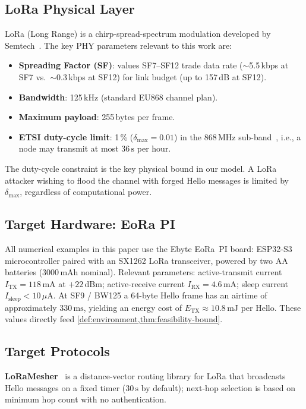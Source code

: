 \documentclass[journal,compsoc]{IEEEtran}
\theoremstyle{plain}
\theoremstyle{definition}
\theoremstyle{remark}
\begin{document}
\subsection{LoRa Physical Layer}

LoRa (Long Range) is a chirp-spread-spectrum modulation developed by
Semtech~\cite{semtech2020sx1262}.  The key PHY parameters relevant to
this work are:
\begin{itemize}[nosep]
  \item \textbf{Spreading Factor (SF)}: values SF7--SF12 trade data rate
        ($\sim$5.5\,kbps at SF7 vs.\ $\sim$0.3\,kbps at SF12) for
        link budget (up to 157\,dB at SF12).
  \item \textbf{Bandwidth}: 125\,kHz (standard EU868 channel plan).
  \item \textbf{Maximum payload}: 255\,bytes per frame.
  \item \textbf{ETSI duty-cycle limit}: 1\,\% ($\delta_{\max}=0.01$) in
        the 868\,MHz sub-band~\cite{etsi300220}, i.e., a node may
        transmit at most $36\,\text{s}$ per hour.
\end{itemize}

The duty-cycle constraint is the key physical bound in our model.  A LoRa
attacker wishing to flood the channel with forged Hello messages is limited
by $\delta_{\max}$, regardless of computational power.

\subsection{Target Hardware: EoRa PI}

All numerical examples in this paper use the Ebyte EoRa~PI board:
ESP32-S3 microcontroller paired with an SX1262 LoRa transceiver, powered
by two AA batteries (3000\,mAh nominal).  Relevant parameters:
active-transmit current $I_{\mathrm{TX}} = 118\,\text{mA}$ at $+22\,\text{dBm}$;
active-receive current $I_{\mathrm{RX}} = 4.6\,\text{mA}$; sleep current
$I_{\mathrm{sleep}} < 10\,\mu\text{A}$.  At SF9 / BW125 a 64-byte Hello
frame has an airtime of approximately $330\,\text{ms}$, yielding an energy
cost of $E_{\mathrm{TX}} \approx 10.8\,\text{mJ}$ per Hello.  These values
directly feed \cref{def:environment,thm:feasibility-bound}.

\subsection{Target Protocols}

\textbf{LoRaMesher}~\cite{loramesherpaper} is a distance-vector routing
library for LoRa that broadcasts Hello messages on a fixed timer ($30\,\text{s}$
by default); next-hop selection is based on minimum hop count with no
authentication.
\end{document}
